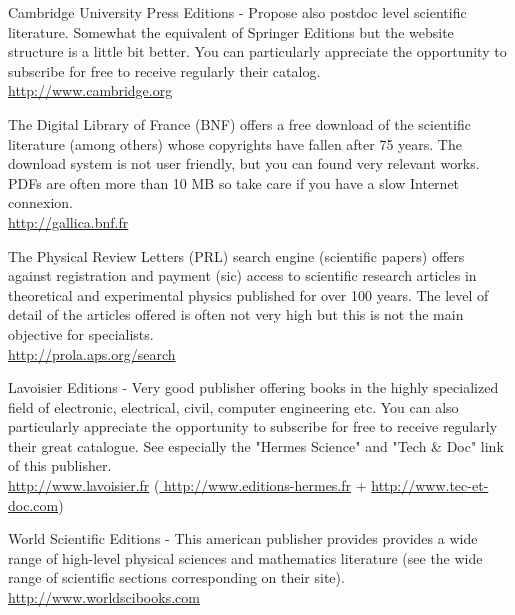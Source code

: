 	{\Large {}}{\Large {}}{\Large {}} Cambridge University Press Editions - Propose also postdoc level scientific literature. Somewhat the equivalent of Springer Editions but the website structure is a little bit better. You can particularly appreciate the opportunity to subscribe for free to receive regularly their catalog.\\
	\href{http://www.cambridge.org}{\color{blue}http://www.cambridge.org}
	
	
	{\Large {}}{\Large {}}{\Large {}}{\Large {}} The Digital Library of France (BNF) offers a free download of the scientific literature (among others) whose copyrights have fallen after 75 years. The download system is not user friendly, but you can found very relevant works. PDFs are often more than 10 MB so take care if you have a slow Internet connexion.\\
	\href{http://gallica.bnf.fr}{\color{blue} http://gallica.bnf.fr}
	
	{\Large {}}{\Large {}}{\Large {}}{\Large {}} The Physical Review Letters (PRL) search engine (scientific papers) offers against registration and payment (sic) access to scientific research articles in theoretical and experimental physics published for over 100 years. The level of detail of the articles offered is often not very high but this is not the main objective for specialists.\\
	\href{http://prola.aps.org/search}{\color{blue} http://prola.aps.org/search}
	
	\pagebreak
	{\Large {}}{\Large {}}{\Large {}} Lavoisier Editions - Very good publisher offering books in the highly specialized field of electronic, electrical, civil, computer engineering etc. You can also particularly appreciate the opportunity to subscribe for free to receive regularly their great catalogue. See especially the "Hermes Science" and "Tech \& Doc" link of this publisher.\\
	\href{http://www.lavoisier.fr}{\color{blue} http://www.lavoisier.fr} (\href{http://www.editions-hermes.fr}{\color{blue} http://www.editions-hermes.fr} + \href{http://www.tec-et-doc.com}{\color{blue} http://www.tec-et-doc.com})
	
	{\Large {}}{\Large {}}{\Large {}} World Scientific Editions - This american publisher provides provides a wide range of high-level physical sciences and mathematics literature (see the wide range of scientific sections corresponding on their site).\\
	\href{http://www.worldscibooks.com}{\color{blue}http://www.worldscibooks.com}
	
